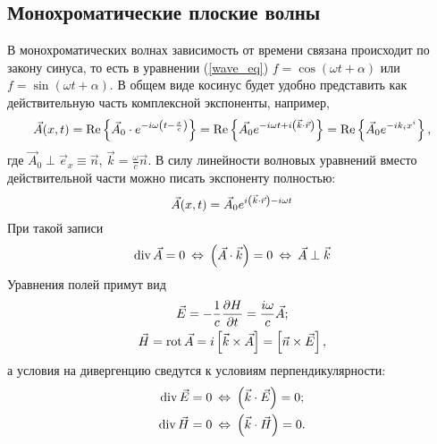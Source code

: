 \subsection{Монохроматические плоские волны}
    В монохроматических волнах зависимость от времени связана происходит по закону синуса, то есть в уравнении (\ref{wave_eq}) 
    $f = \cos(\omega t + \alpha)$ или $f = \sin(\omega t + \alpha)$.
    В общем виде косинус будет удобно представить как действительную часть комплексной экспоненты, например,
    \[
        \vec{A}(x, t) = \operatorname{Re}\left\{{\vec{A}_0 \cdot e^{-i\omega\left({t - \frac{x}{c}}\right)}}\right\} = 
        \operatorname{Re}\left\{{\vec{A_0}e^{-i\omega t + i\left({\vec{k}\cdot\vec{r}}\right)}}\right\} = \operatorname{Re}\left\{{\vec{A}_0e^{-ik_ix^i}}\right\},
    \]
    где $\vec{A}_0 \perp \vec{e}_x \equiv \vec{n}$, $\vec{k} = \frac{\omega}c\vec{n}$.
    В силу линейности волновых уравнений вместо действительной части можно писать экспоненту полностью:
    \[
        \vec{A}(x, t) = \vec{A}_0e^{i\left({\vec{k}\cdot\vec{r}}\right) - i\omega t}
    \]
    При такой записи
    \[
        \operatorname{div}\vec{A} = 0 \: \Leftrightarrow \: \left({\vec{A}\cdot\vec{k}}\right) = 0 \: \Leftrightarrow \: \vec{A} \perp \vec{k}
    \]
    Уравнения полей примут вид
    \begin{gather*}
        \vec{E} = -\frac 1c \frac{\partial H}{\partial t} = \frac{i\omega}c\vec{A};\\
        \vec{H} = \operatorname{rot}\vec{A} = i\left[{\vec{k}\times\vec{A}}\right] = \left[{\vec{n}\times\vec{E}}\right],
    \end{gather*}
    а условия на дивергенцию сведутся к условиям перпендикулярности:
    \begin{gather*}
        \operatorname{div}\vec{E} = 0 \: \Leftrightarrow \: \left({\vec{k}\cdot\vec{E}}\right) = 0;\\
        \operatorname{div}\vec{H} = 0 \: \Leftrightarrow \: \left({\vec{k}\cdot\vec{H}}\right) = 0.
    \end{gather*}

